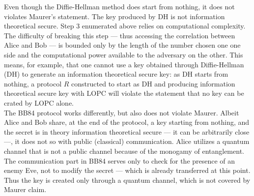 	 Even though the Diffie-Hellman method does start from nothing, it does not violates Maurer's statement.
	 The key produced by DH is not information theoretical secure. 
	 Step $3$ enumerated above relies on computational complexity.
	 The difficulty of breaking this step --- thus accessing the correlation between Alice and Bob --- is bounded only by the length of the number chosen one one side and the computational power available to the adversary on the other.
	 This means, for example, that one cannot use a key obtained through Diffie-Hellman (DH) to generate an information theoretical secure key: 
	 as DH starts from nothing, a protocol $R$ constructed to start as DH and producing information theoretical secure key with LOPC will violate the statement that no key can be crated by LOPC alone.\\
	 The BB84 protocol works differently, but also does not violate Maurer.
	 Albeit Alice and Bob share, at the end of the protocol, a key starting from nothing, and the secret is in theory information theoretical secure --- it can be arbitrarily close ---, it does not so with public (classical) communication.
	 Alice utilizes a quantum channel that is not a public channel because of the monogamy of entanglement.
	 The communication part in BB84 serves only to check for the presence of an enemy Eve, not to modify the secret --- which is already transferred at this point.  
	 Thus the key is created only through a quantum channel, which is not covered by Maurer claim.\\

%	
	 
